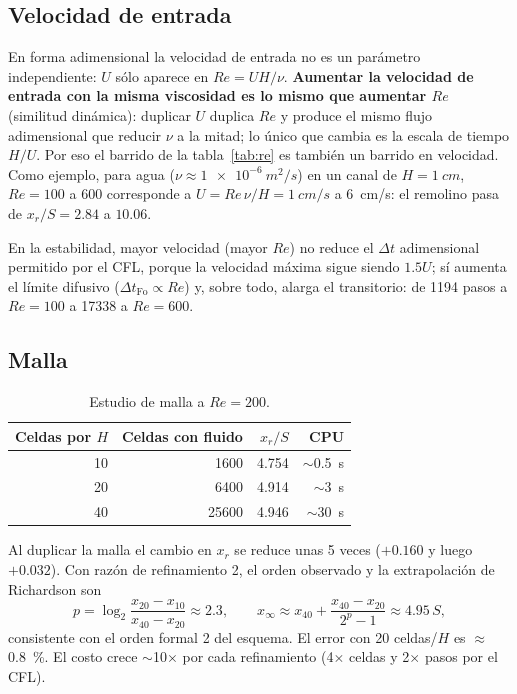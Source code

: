 \documentclass[11pt,letterpaper]{article}
\newcommand{\Rey}{\mathit{Re}}
\begin{document}
\subsection{Velocidad de entrada}

En forma adimensional la velocidad de entrada no es un parámetro independiente: $U$ sólo aparece en $\Rey=UH/\nu$.
\textbf{Aumentar la velocidad de entrada con la misma viscosidad es lo mismo que aumentar $\Rey$} (similitud dinámica):
duplicar $U$ duplica $\Rey$ y produce el mismo flujo adimensional que reducir $\nu$ a la mitad; lo único que cambia es la
escala de tiempo $H/U$. Por eso el barrido de la tabla~\ref{tab:re} es también un barrido en velocidad. Como ejemplo,
para agua ($\nu\approx\SI{1e-6}{m^2/s}$) en un canal de $H=\SI{1}{cm}$, $\Rey=100$ a 600 corresponde a
$U=\Rey\,\nu/H=\SI{1}{cm/s}$ a \SI{6}{cm/s}: el remolino pasa de $x_r/S=2.84$ a $10.06$.

En la estabilidad, mayor velocidad (mayor $\Rey$) no reduce el $\Delta t$ adimensional permitido por el CFL, porque la
velocidad máxima sigue siendo $1.5U$; sí aumenta el límite difusivo ($\Delta t_{\text{Fo}}\propto\Rey$) y, sobre todo,
alarga el transitorio: de 1194 pasos a $\Rey=100$ a \num{17338} a $\Rey=600$.

\subsection{Malla}

\begin{table}[H]
\centering\small
\caption{Estudio de malla a $\Rey=200$.}
\label{tab:malla}
\begin{tabular}{@{}rrrr@{}}
\toprule
Celdas por $H$ & Celdas con fluido & $x_r/S$ & CPU\\
\midrule
10 & 1600 & 4.754 & $\sim$\SI{0.5}{s}\\
20 & 6400 & 4.914 & $\sim$\SI{3}{s}\\
40 & 25600 & 4.946 & $\sim$\SI{30}{s}\\
\bottomrule
\end{tabular}
\end{table}

Al duplicar la malla el cambio en $x_r$ se reduce unas 5 veces ($+0.160$ y luego $+0.032$). Con razón de refinamiento 2,
el orden observado y la extrapolación de Richardson son
\begin{equation}
p=\log_2\frac{x_{20}-x_{10}}{x_{40}-x_{20}}\approx2.3,\qquad
x_\infty\approx x_{40}+\frac{x_{40}-x_{20}}{2^p-1}\approx4.95\,S,
\end{equation}
consistente con el orden formal 2 del esquema. El error con 20 celdas/$H$ es $\approx$\SI{0.8}{\percent}. El costo crece
$\sim$10$\times$ por cada refinamiento (4$\times$ celdas y 2$\times$ pasos por el CFL).
\end{document}
